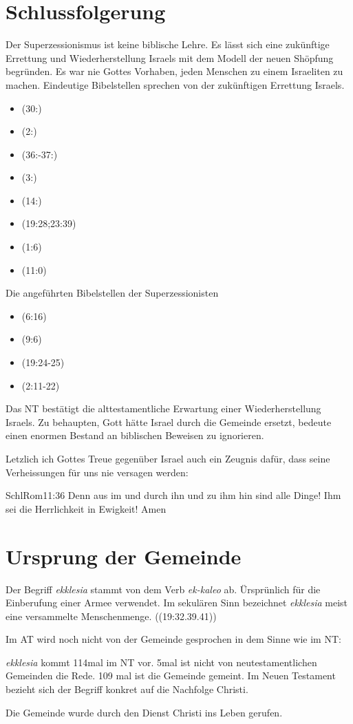 \documentclass{../../inc/mybib}
\begin{document}
\section{Schlussfolgerung}
Der Superzessionismus ist keine biblische Lehre. Es lässt sich eine zukünftige Errettung und Wiederherstellung Israels mit dem Modell der neuen Shöpfung begründen. Es war nie Gottes Vorhaben, jeden Menschen zu einem Israeliten zu machen. Eindeutige Bibelstellen sprechen von der zukünftigen Errettung Israels.
\begin{itemize}
    \item {}(30:)
    \item {}(2:)
    \item {}(36:-37:)
    \item {}(3:)
    \item {}(14:)
    \item {}(19:28;23:39)
    \item {}(1:6)
    \item {}(11:0)
\end{itemize}
Die angeführten Bibelstellen der Superzessionisten
\begin{itemize}
    \item {}(6:16)
    \item {}(9:6)
    \item {}(19:24-25)
    \item {}(2:11-22)
\end{itemize}
Das NT bestätigt die alttestamentliche Erwartung einer Wiederherstellung Israels. Zu behaupten, Gott hätte Israel durch die Gemeinde ersetzt, bedeute einen enormen Bestand an biblischen Beweisen zu ignorieren.

Letzlich ich Gottes Treue gegenüber Israel auch ein Zeugnis dafür, dass seine Verheissungen für uns nie versagen werden:
\begin{bibelbox}{Schl}{Rom}{11:36}
    Denn aus im und durch ihn und zu ihm hin sind alle Dinge! Ihm sei die Herrlichkeit in Ewigkeit! Amen
\end{bibelbox}
\section{Ursprung der Gemeinde}
Der Begriff \textit{ekklesia} stammt von dem Verb \textit{ek-kaleo} ab. Ürsprünlich für die Einberufung einer Armee verwendet. Im sekulären Sinn bezeichnet \textit{ekklesia} meist eine versammelte Menschenmenge. ((19:32.39.41))

Im AT wird noch nicht von der Gemeinde gesprochen in dem Sinne wie im NT:

\textit{ekklesia} kommt 114mal im NT vor. 5mal ist nicht von neutestamentlichen Gemeinden die Rede. 109 mal ist die Gemeinde gemeint. Im Neuen Testament bezieht sich der Begriff konkret auf die Nachfolge Christi.

Die Gemeinde wurde durch den Dienst Christi ins Leben gerufen.
\end{document}
